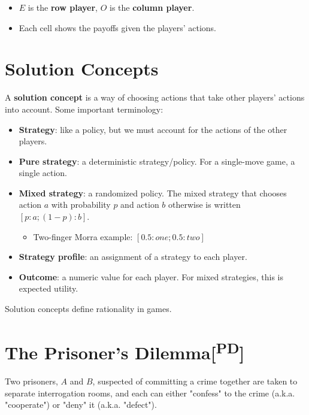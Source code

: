 \documentclass[11pt]{article}
\begin{document}
\begin{itemize}
\item \(E\) is the \textbf{row player}, \(O\) is the \textbf{column player}.
\item Each cell shows the payoffs given the players' actions.
\end{itemize}
\section{Solution Concepts}
\label{sec:org9c1f080}

A \textbf{solution concept} is a way of choosing actions that take other players' actions into account.  Some important terminology:

\begin{itemize}
\item \textbf{Strategy}: like a policy, but we must account for the actions of the other players.

\item \textbf{Pure strategy}: a deterministic strategy/policy.  For a single-move game, a single action.

\item \textbf{Mixed strategy}: a randomized policy.  The mixed strategy that chooses action \(a\) with probability \(p\) and action \(b\) otherwise is written \([p:a;(1 - p):b]\).

\begin{itemize}
\item Two-finger Morra example: \([0.5:one;0.5:two]\)
\end{itemize}

\item \textbf{Strategy profile}: an assignment of a strategy to each player.

\item \textbf{Outcome}: a numeric value for each player.  For mixed strategies, this is expected utility.
\end{itemize}

Solution concepts define rationality in games.
\section{The Prisoner's Dilemma[\textsuperscript{PD}]}
\label{sec:org0f4bac8}

Two prisoners, \(A\) and \(B\), suspected of committing a crime together are taken to separate interrogation rooms, and each can either "confess" to the crime (a.k.a. "cooperate") or "deny" it (a.k.a. "defect").
\end{document}
